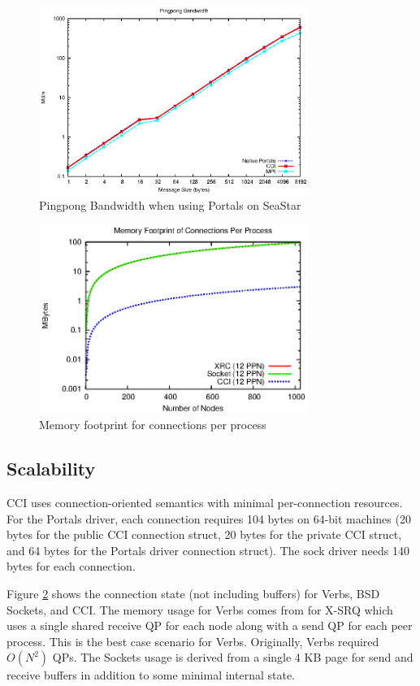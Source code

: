 \begin{figure}[htbp]
\centering
\includegraphics[width=3.45in]{pingpong-bw.eps}
\caption{Pingpong Bandwidth when using Portals on SeaStar}
\label{fig:bw}
\end{figure}

\begin{figure}[htbp]
\centering
\includegraphics[width=3.45in]{memory_log.eps}
\caption{Memory footprint for connections per process}
\label{fig:memory}
\end{figure}

\subsection{Scalability}
CCI uses connection-oriented semantics with minimal per-connection resources.
For the Portals driver, each connection requires 104 bytes on 64-bit machines
(20 bytes for the public CCI connection struct, 20 bytes for the private CCI
struct, and 64 bytes for the Portals driver connection struct).  The sock driver
needs 140 bytes for each connection.

Figure \ref{fig:memory} shows the connection state (not including buffers) for
Verbs, BSD Sockets, and CCI. The memory usage for Verbs comes from
\cite{Shipman:2008:XIS:1431669.1431683} for X-SRQ which uses a single shared
receive QP for each node along with a send QP for each peer process. This is
the best case scenario for Verbs. Originally, Verbs required
\begin{math}O(N^2)\end{math} QPs. The Sockets usage is derived from a single 4
KB page for send and receive buffers in addition to some minimal internal state.

